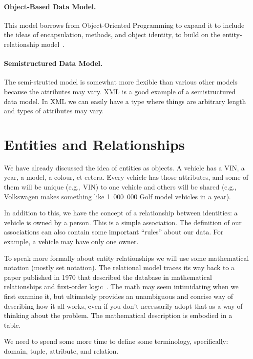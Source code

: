 \paragraph{Object-Based Data Model.} This model borrows from Object-Oriented Programming to expand it to include the ideas of encapsulation, methods, and object identity, to build on the entity-relationship model~\cite{dsc}.

\paragraph{Semistructured Data Model.} The semi-strutted model is somewhat more flexible than various other models because the attributes may vary. XML is a good example of a semistructured data model. In XML we can easily have a type where things are arbitrary length and types of attributes may vary. 

\section*{Entities and Relationships}

We have already discussed the idea of entities as objects. A vehicle has a VIN, a year, a model, a colour, et cetera. Every vehicle has those attributes, and some of them will be unique (e.g., VIN) to one vehicle and others will be shared (e.g., Volkswagen makes something like 1~000~000 Golf model vehicles in a year). 

In addition to this, we have the concept of a relationship between identities: a vehicle is owned by a person. This is a simple association. The definition of our associations can also contain some important ``rules'' about our data. For example, a vehicle may have only one owner.

To speak more formally about entity relationships we will use some mathematical notation (mostly set notation). The relational model traces its way back to a paper published in 1970 that described the database in mathematical relationships and first-order logic~\cite{codd}. The math may seem intimidating when we first examine it, but ultimately provides an unambiguous and concise way of describing how it all works, even if you don't necessarily adopt that as a way of thinking about the problem. The mathematical description is embodied in a table. 

We need to spend some more time to define some terminology, specifically: domain, tuple, attribute, and relation.  

